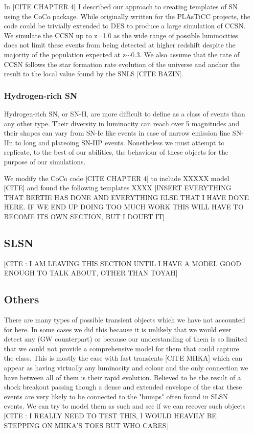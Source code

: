 In [CITE CHAPTER 4] I described our approach to creating templates of SN using the CoCo package. While originally written for the PLAsTiCC projects, the code could be trivially extended to DES to produce a large simulation of CCSN. We simulate the CCSN up to z=1.0 as the wide range of possible luminocities does not limit these events from being detected at higher redshift despite the majority of the population expected at z$\sim$0.3. We also assume that the rate of CCSN follows the star formation rate evolution of the universe and anchor the result to the local value found by the SNLS [CITE BAZIN]. \\

\subsubsection{Hydrogen-rich SN}
Hydrogen-rich SN, or SN-II, are more difficult to define as a class of events than any other type. Their diversity in luminocity can reach over 5 magnitudes and their shapes can vary from SN-Ic like events in case of narrow emission line SN-IIn to long and plateoing SN-IIP events. Nonetheless we must attempt to replicate, to the best of our abilities, the behaviour of these objects for the purpose of our simulations.

We modify the CoCo code [CITE CHAPTER 4] to include XXXXX model [CITE] and found the following templates XXXX [INSERT EVERYTHING THAT BERTIE HAS DONE AND EVERYTHING ELSE THAT I HAVE DONE HERE. IF WE END UP DOING TOO MUCH WORK THIS WILL HAVE TO BECOME ITS OWN SECTION, BUT I DOUBT IT]

\subsection{SLSN}
[CITE : I AM LEAVING THIS SECTION UNTIL I HAVE A MODEL GOOD ENOUGH TO TALK ABOUT, OTHER THAN TOYAH]

\subsection{Others}
There are many types of possible transient objects which we have not accounted for here. In some cases we did this because it is unlikely that we would ever detect any (GW counterpart) or because our understanding of them is so limited that we could not provide a comprehensive model for them that could capture the class. This is mostly the case with fast transients [CITE MIIKA] which can appear as having virtually any luminocity and colour and the only connection we have between all of them is their rapid evolution. Believed to be the result of a shock breakout passing though a dense and extended envelope of the star these events are very likely to be connected to the "bumps" often found in SLSN events. We can try to model them as such and see if we can recover such objects [CITE : I REALLY NEED TO TEST THIS, I WOULD HEAVILY BE STEPPING ON MIIKA'S TOES BUT WHO CARES]


